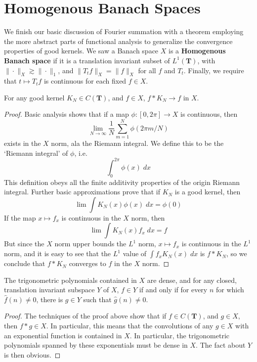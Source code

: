 \section{Homogenous Banach Spaces}

We finish our basic discussion of Fourier summation with a theorem employing the more abstract parts of functional analysis to generalize the convergence properties of good kernels. We saw a Banach space $X$ is a {\bf Homogenous Banach space} if it is a translation invariant subset of $L^1(\mathbf{T})$, with $\| \cdot \|_X \gtrsim \| \cdot \|_1$, and $\| T_t f \|_X = \| f \|_X$ for all $f$ and $T_t$. Finally, we require that $t \mapsto T_t f$ is continuous for each fixed $f \in X$.

\begin{theorem}
	For any good kernel $K_N \in C(\mathbf{T})$, and $f \in X$, $f * K_N \to f$ in $X$.
\end{theorem}
\begin{proof}
	Basic analysis shows that if a map $\phi: [0,2\pi] \to X$ is continuous, then
%
\[ \lim_{N \to \infty} \frac{1}{N} \sum_{m = 1}^N \phi(2\pi m/N) \]
%
exists in the $X$ norm, ala the Riemann integral. We define this to be the `Riemann integral' of $\phi$, i.e.
%
\[ \int_0^{2\pi} \phi(x)\; dx \]
%
This definition obeys all the finite additivity properties of the origin Riemann integral. Further basic approximations prove that if $K_N$ is a good kernel, then
%
\[ \lim \int K_N(x) \phi(x)\; dx = \phi(0) \]
%
If the map $x \mapsto f_x$ is continuous in the $X$ norm, then
%
\[ \lim \int K_N(x) f_x\; dx = f \]
%
But since the $X$ norm upper bounds the $L^1$ norm, $x \mapsto f_x$ is continuous in the $L^1$ norm, and it is easy to see that the $L^1$ value of $\int f_x K_N(x)\; dx$ is $f * K_N$, so we conclude that $f * K_N$ converges to $f$ in the $X$ norm.
\end{proof}

\begin{corollary}
	The trigonometric polynomials contained in $X$ are dense, and for any closed, translation invariant subspace $Y$ of $X$, $f \in Y$ if and only if for every $n$ for which $\widehat{f}(n) \neq 0$, there is $g \in Y$ such that $\widehat{g}(n) \neq 0$.
\end{corollary}
\begin{proof}
	The techniques of the proof above show that if $f \in C(\mathbf{T})$, and $g \in X$, then $f * g \in X$. In particular, this means that the convolutions of any $g \in X$ with an exponential function is contained in $X$. In particular, the trigonometric polynomials spanned by these exponentials must be dense in $X$. The fact about $Y$ is then obvious.
\end{proof}

